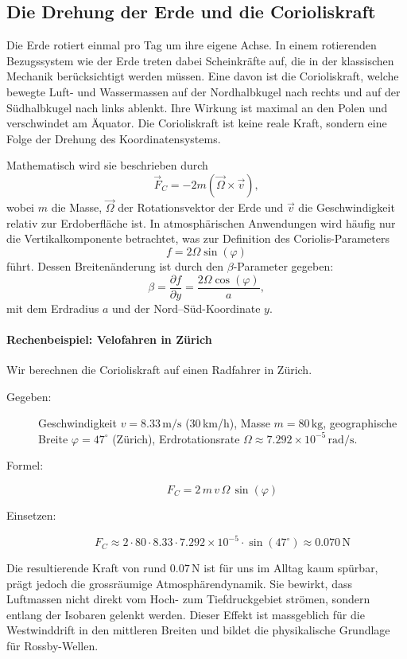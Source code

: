 \subsection{Die Drehung der Erde und die Corioliskraft}

Die Erde rotiert einmal pro Tag um ihre eigene Achse. In einem rotierenden Bezugssystem wie der Erde treten dabei Scheinkräfte auf, die in der klassischen Mechanik berücksichtigt werden müssen. Eine davon ist die {Corioliskraft}, welche bewegte Luft- und Wassermassen auf der {Nordhalbkugel} nach rechts und auf der {Südhalbkugel} nach links ablenkt. Ihre Wirkung ist maximal an den Polen und verschwindet am Äquator. Die Corioliskraft ist keine reale Kraft, sondern eine Folge der Drehung des Koordinatensystems.

Mathematisch wird sie beschrieben durch
\[
	\vec{F}_C = -2m(\vec{\Omega} \times \vec{v}),
\]
wobei \(m\) die Masse, \(\vec{\Omega}\) der Rotationsvektor der Erde und \(\vec{v}\) die Geschwindigkeit relativ zur Erdoberfläche ist. In atmosphärischen Anwendungen wird häufig nur die Vertikalkomponente betrachtet, was zur Definition des {Coriolis-Parameters}
\[
	f = 2\Omega \sin(\varphi)
\]
führt. Dessen Breitenänderung ist durch den \(\beta\)-Parameter gegeben:
\[
	\beta = \frac{\partial f}{\partial y} = \frac{2 \Omega \cos(\varphi)}{a},
\]
mit dem Erdradius \(a\) und der Nord–Süd-Koordinate \(y\).

\paragraph{Rechenbeispiel: Velofahren in Zürich}

Wir berechnen die Corioliskraft auf einen Radfahrer in Zürich.

\begin{description}
	\item[Gegeben:] Geschwindigkeit \(v = 8.33\,\mathrm{m/s}\) (30\,km/h), Masse \(m = 80\,\mathrm{kg}\), geographische Breite \(\varphi = 47^\circ\) (Zürich), Erdrotationsrate \(\Omega \approx 7.292 \times 10^{-5}\,\mathrm{rad/s}\).
	\item[Formel:]
		\[
			F_C = 2\,m\,v\,\Omega\,\sin(\varphi)
		\]
	\item[Einsetzen:]
		\[
			F_C \approx 2 \cdot 80 \cdot 8.33 \cdot 7.292 \times 10^{-5} \cdot \sin(47^\circ)
			\approx 0.070\,\mathrm{N}
		\]
\end{description}

\noindent
Die resultierende Kraft von rund \(0.07\,\mathrm{N}\) ist für uns im Alltag kaum spürbar, prägt jedoch die grossräumige Atmosphärendynamik.
Sie bewirkt, dass Luftmassen nicht direkt vom Hoch- zum Tiefdruckgebiet strömen, sondern entlang der Isobaren gelenkt werden.
Dieser Effekt ist massgeblich für die Westwinddrift in den mittleren Breiten und bildet die physikalische Grundlage für Rossby-Wellen.

